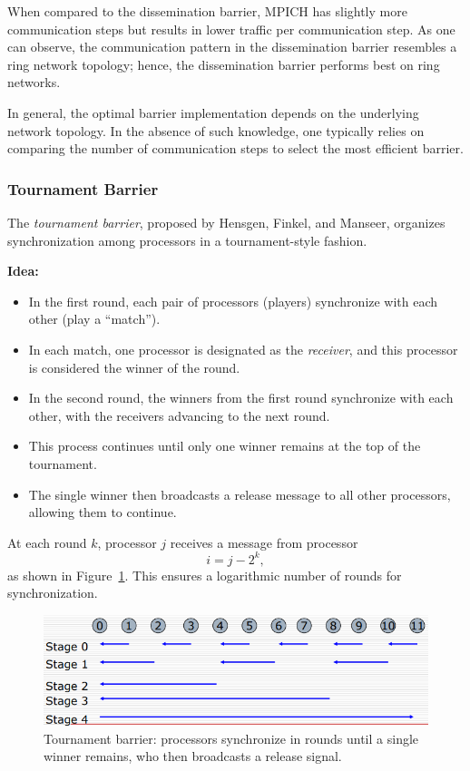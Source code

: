 \documentclass[12pt]{book}
\begin{document}
When compared to the dissemination barrier, MPICH has slightly more communication steps but results in lower traffic per communication step. As one can observe, the communication pattern in the dissemination barrier resembles a ring network topology; hence, the dissemination barrier performs best on ring networks.

In general, the optimal barrier implementation depends on the underlying network topology. In the absence of such knowledge, one typically relies on comparing the number of communication steps to select the most efficient barrier.

\subsubsection{Tournament Barrier}

The \textit{tournament barrier}, proposed by Hensgen, Finkel, and Manseer, organizes synchronization among processors in a tournament-style fashion.  

\textbf{Idea:}  
\begin{itemize}
    \item In the first round, each pair of processors (players) synchronize with each other (play a ``match'').
    \item In each match, one processor is designated as the \textit{receiver}, and this processor is considered the winner of the round.
    \item In the second round, the winners from the first round synchronize with each other, with the receivers advancing to the next round.
    \item This process continues until only one winner remains at the top of the tournament.
    \item The single winner then broadcasts a release message to all other processors, allowing them to continue.
\end{itemize}

At each round $k$, processor $j$ receives a message from processor
\[
i = j - 2^k,
\]
as shown in Figure~\ref{fig:tourbar}. This ensures a logarithmic number of rounds for synchronization.

\begin{figure}[ht]
    \centering
    \includegraphics[width=0.5\linewidth]{images/tournamentselc.png}
    \caption{Tournament barrier: processors synchronize in rounds until a single winner remains, who then broadcasts a release signal.}
    \label{fig:tourbar}
\end{figure}
\end{document}
